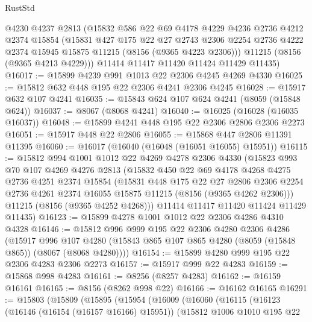 \begin{lexlean}{RustStd}
\begin{coremodule}
{\begin{coremodule}
{{{{{{{{{{{{{{{{{{{{{{{{{{{{{{{{{{      @4230
      @4237
      @2813
      (@15832
        @586
        @22
        @69
        @4178
        @4229
        @4236
        @2736
        @4212
        @2374
        @15854
        (@15831
          @427
          @175
          @22
          @27
          @2743
          @2306
          @2254
          @2736
          @4222
          @2374
          @15945
          @15875
          @11215
          (@8156 (@9365 @4223 @2306)))
        @11215
        (@8156 (@9365 @4213 @4229)))
      @11414
      @11417
      @11420
      @11424
      @11429
      @11435)
@16017 := @15899 @4239 @991 @1013 @22 @2306 @4245 @4269 @4330
@16025 := @15812 @632 @448 @195 @22 @2306 @4241 @2306 @4245
@16028 := @15917 @632 @107 @4241
@16035 := @15843 @624 @107 @624 @4241 (@8059 (@15848 @624))
@16037 := @8067 (@8068 @4241)
@16040 := @16025 (@16028 (@16035 @16037))
@16048 := @15899 @4241 @448 @195 @22 @2306 @2806 @2306 @2273
@16051 := @15917 @448 @22 @2806
@16055 := @15868 @447 @2806 @11391 @11395
@16060 := @16017 (@16040 (@16048 (@16051 @16055) @15951))
@16115 := @15812
    @994
    @1001
    @1012
    @22
    @4269
    @4278
    @2306
    @4330
    (@15823
      @993
      @70
      @107
      @4269
      @4276
      @2813
      (@15832
        @450
        @22
        @69
        @4178
        @4268
        @4275
        @2736
        @4251
        @2374
        @15854
        (@15831
          @448
          @175
          @22
          @27
          @2806
          @2306
          @2254
          @2736
          @4261
          @2374
          @16055
          @15875
          @11215
          (@8156 (@9365 @4262 @2306)))
        @11215
        (@8156 (@9365 @4252 @4268)))
      @11414
      @11417
      @11420
      @11424
      @11429
      @11435)
@16123 := @15899 @4278 @1001 @1012 @22 @2306 @4286 @4310 @4328
@16146 := @15812
    @996
    @999
    @195
    @22
    @2306
    @4280
    @2306
    @4286
    (@15917
      @996
      @107
      @4280
      (@15843 @865 @107 @865 @4280 (@8059 (@15848 @865)) (@8067 (@8068 @4280))))
@16154 := @15899 @4280 @999 @195 @22 @2306 @4283 @2306 @2273
@16157 := @15917 @999 @22 @4283
@16159 := @15868 @998 @4283
@16161 := @8256 (@8257 @4283)
@16162 := @16159 @16161
@16165 := @8156 (@8262 @998 @22)
@16166 := @16162 @16165
@16291 := @15803
    (@15809
      (@15895
        (@15954
          (@16009
            (@16060
              (@16115
                (@16123
                  (@16146 (@16154 (@16157 @16166) @15951))
                  (@15812
                    @1006
                    @1010
                    @195
                    @22
}}}}}}}}}}}}}}}}}}}}}}}}}}}}}}}}}}
\end{coremodule}}
\end{coremodule}
\end{lexlean}
